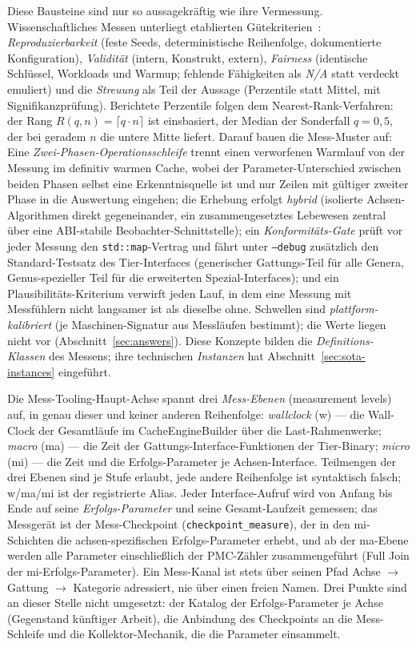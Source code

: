 \begin{nurkurz}
Diese Bausteine sind nur so aussagekräftig wie ihre Vermessung. Wissenschaftliches Messen unterliegt etablierten
Gütekriterien~\cite{hoefler2015benchmarking}: \emph{Reproduzierbarkeit} (feste Seeds, deterministische
Reihenfolge, dokumentierte Konfiguration), \emph{Validität} (intern, Konstrukt, extern), \emph{Fairness}
(identische Schlüssel, Workloads und Warmup; fehlende Fähigkeiten als \emph{N/A} statt verdeckt emuliert) und
die \emph{Streuung} als Teil der Aussage (Perzentile statt Mittel, mit Signifikanzprüfung). Berichtete
Perzentile folgen dem Nearest-Rank-Verfahren: der Rang $R(q,n)=\lceil q\cdot n\rceil$ ist einsbasiert, der
Median der Sonderfall $q=0{,}5$, der bei geradem $n$ die untere Mitte liefert. Darauf bauen die Mess-Muster auf:
Eine \emph{Zwei-Phasen-Operationsschleife} trennt einen verworfenen Warmlauf von der Messung im definitiv warmen
Cache, wobei der Parameter-Unterschied zwischen beiden Phasen selbst eine Erkenntnisquelle ist und nur Zeilen
mit gültiger zweiter Phase in die Auswertung eingehen; die Erhebung erfolgt \emph{hybrid} (isolierte
Achsen-Algorithmen direkt gegeneinander, ein zusammengesetztes Lebewesen zentral über eine ABI-stabile
Beobachter-Schnittstelle); ein \emph{Konformitäts-Gate} prüft vor jeder Messung den
\texttt{std::map}-Vertrag und fährt unter \texttt{--debug} zusätzlich den Standard-Testsatz des
Tier-Interfaces (generischer Gattungs-Teil für alle Genera, Genus-spezieller Teil für die erweiterten
Spezial-Interfaces); und ein Plausibilitäts-Kriterium verwirft jeden Lauf, in dem eine Messung mit
Messfühlern nicht langsamer ist als dieselbe ohne. Schwellen sind \emph{plattform-kalibriert} (je
Maschinen-Signatur aus Messläufen bestimmt); die Werte liegen nicht vor (Abschnitt~\ref{sec:answers}). Diese
Konzepte bilden die \emph{Definitions-Klassen} des Messens; ihre technischen \emph{Instanzen} hat
Abschnitt~\ref{sec:sota-instances} eingeführt.
\end{nurkurz}

Die Mess-Tooling-Haupt-Achse spannt drei \emph{Mess-Ebenen} (measurement levels) auf, in genau dieser
und keiner anderen Reihenfolge: \emph{wallclock} (w) --- die Wall-Clock der Gesamtläufe im
CacheEngineBuilder über die Last-Rahmenwerke; \emph{macro} (ma) --- die Zeit der
Gattungs-Interface-Funktionen der Tier-Binary; \emph{micro} (mi) --- die Zeit und die Erfolgs-Parameter je
Achsen-Interface. Teilmengen der drei Ebenen sind je Stufe erlaubt, jede andere Reihenfolge ist
syntaktisch falsch; w/ma/mi ist der registrierte Alias. Jeder Interface-Aufruf wird von Anfang bis Ende
auf seine \emph{Erfolgs-Parameter} und seine Gesamt-Laufzeit gemessen; das Messgerät ist der
Mess-Checkpoint (\texttt{checkpoint\_measure}), der in den mi-Schichten die achsen-spezifischen
Erfolgs-Parameter erhebt, und ab der ma-Ebene werden alle Parameter einschließlich der PMC-Zähler
zusammengeführt (Full Join der mi-Erfolgs-Parameter). Ein Mess-Kanal ist stets über seinen Pfad Achse
$\to$ Gattung $\to$ Kategorie adressiert, nie über einen freien Namen. Drei Punkte sind an dieser Stelle nicht
umgesetzt: der Katalog der Erfolgs-Parameter je Achse (Gegenstand künftiger Arbeit), die
Anbindung des Checkpoints an die Mess-Schleife und die Kollektor-Mechanik, die die
Parameter einsammelt.

